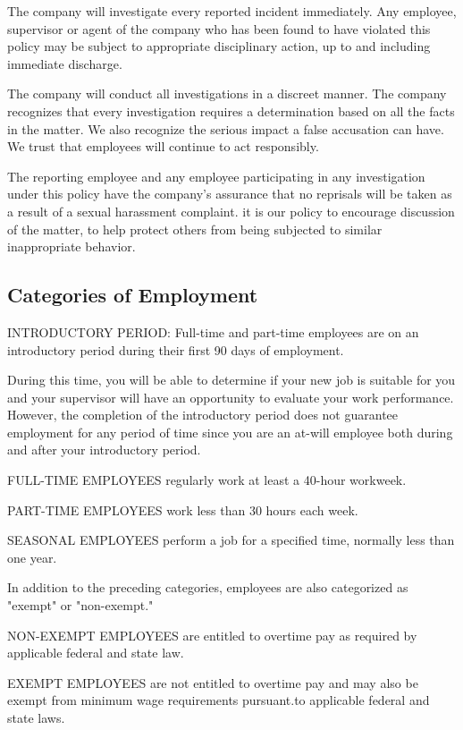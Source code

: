 The company will investigate every reported incident immediately. Any employee, supervisor or agent of the company who has been found to have violated this policy may be subject to appropriate disciplinary action, up to and including immediate discharge.

The company will conduct all investigations in a discreet manner. The company recognizes that every investigation requires a determination based on all the facts in the matter. We also recognize the serious impact a false accusation can have. We trust that employees will continue to act responsibly.

The reporting employee and any employee participating in any investigation under this policy have the company's assurance that no reprisals will be taken as a result of a sexual harassment complaint. it is our policy to encourage discussion of the matter, to help protect others from being subjected to similar inappropriate behavior.

\subsection{Categories of Employment}

INTRODUCTORY PERIOD: Full-time and part-time employees are on an introductory period during their first 90 days of employment.

During this time, you will be able to determine if your new job is suitable for you and your supervisor will have an opportunity to evaluate your work performance. However, the completion of the introductory period does not guarantee employment for any period of time since you are an at-will employee both during and after your introductory period.

FULL-TIME EMPLOYEES regularly work at least a 40-hour workweek.

PART-TIME EMPLOYEES work less than 30 hours each week.

SEASONAL EMPLOYEES perform a job for a specified time, normally less than one year.

In addition to the preceding categories, employees are also categorized as "exempt" or "non-exempt."

NON-EXEMPT EMPLOYEES are entitled to overtime pay as required by applicable federal and state law.

EXEMPT EMPLOYEES are not entitled to overtime pay and may also be exempt from minimum wage requirements pursuant.to applicable federal and state laws.

